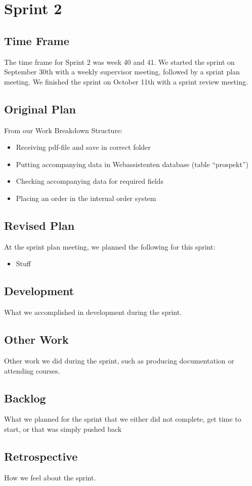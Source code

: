\section{Sprint 2}

\subsection{Time Frame}
The time frame for Sprint 2 was week 40 and 41. We started the sprint on September 30th with a weekly supervisor meeting, followed by a sprint plan meeting. We finished the sprint on October 11th with a sprint review meeting.

\subsection{Original Plan}
From our Work Breakdown Structure:
\begin{itemize}
	\item Receiving pdf-file and save in correct folder
	\item Putting accompanying data in Webassistenten database (table “prospekt”)
	\item Checking accompanying data for required fields
	\item Placing an order in the internal order system
\end{itemize}

\subsection{Revised Plan}
At the sprint plan meeting, we planned the following for this sprint:
\begin{itemize}
	\item Stuff
\end{itemize}

\subsection{Development}
What we accomplished in development during the sprint.

\subsection{Other Work}
Other work we did during the sprint, such as producing documentation or attending courses.

\subsection{Backlog}
What we planned for the sprint that we either did not complete, get time to start, or that was simply pushed back

\subsection{Retrospective}
How we feel about the sprint.